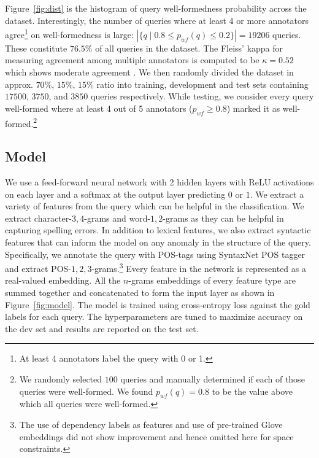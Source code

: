 \documentclass[11pt,a4paper]{article}
\newcommand{\mfar}[1]{\textcolor{red}{[\small{#1}-MFAR]}}
\begin{document}
Figure~\ref{fig:dist} is the histogram of query well-formedness probability across
the dataset. Interestingly, the number of queries where at least 4 or more annotators 
agree\footnote{At least 4 annotators label the query with 0 or 1.} on
well-formedness is large:
$|\{ q \mid 0.8 \le p_{wf}(q) \le 0.2\}| = 19206$
queries. These constitute $76.5\%$ of all queries in the dataset. 
The Fleiss' kappa \cite{fleiss1971measuring} for measuring agreement among multiple
annotators is computed to be $\kappa=0.52$ which shows moderate agreement \cite{landis1977measurement}.
We then randomly divided the dataset in approx. $70\%$, $15\%$, $15\%$ ratio into
training, development and test sets containing $17500$, $3750$, and $3850$ queries respectively.  While testing, we consider every query well-formed where at least 4 out of 5 
annotators ($p_{wf}\ge0.8 $) marked it as well-formed.\footnote{We randomly selected $100$ queries and
manually determined if each of those queries were well-formed. We found $p_{wf}(q)=0.8$ to be the
value above which all queries were well-formed.}

\subsection{Model}
\label{sec:model}

We use a feed-forward neural network with 2 hidden layers
with ReLU activations \cite{relu} on each layer and a softmax at the output layer
predicting $0$ or $1$. 
We extract
a variety of features from the query which can be helpful in the classification. We
extract character-$3,4$-grams and word-$1,2$-grams as they can be helpful in capturing
spelling errors. In addition to lexical features, we also extract syntactic features that
can inform the model on any anomaly in the structure of the query. Specifically, we
annotate the query with POS-tags using SyntaxNet POS tagger
\cite{alberti-EtAl:2015:EMNLP} and extract POS-$1,2,3$-grams.\footnote{The use of dependency labels as features and use of pre-trained Glove embeddings
did not show improvement and hence omitted here for space constraints.}
Every feature in the network is represented as a real-valued embedding. All the $n$-grams
embeddings of every feature type are summed together and concatenated to form the input layer as shown in Figure~\ref{fig:model}.
The model is trained using cross-entropy loss against the gold labels for each
query. The hyperparameters are tuned to maximize accuracy
on the dev set and results are reported on the test set.%
\end{document}
